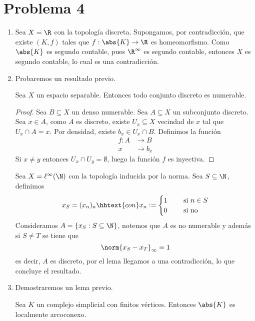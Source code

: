 \documentclass{article}
\begin{document}
\section*{Problema 4}
\begin{enumerate}
    \item Sea $X=\R$ con la topología discreta. Supongamos, por contradicción, que existe $(K,f)$
    tales que $f:\abs{K}\to\R$ es homeomorfismo. Como $\abs{K}$ es segundo contable, pues 
    $\R^{\infty}$ es segundo contable, entonces $X$ es segundo contable, lo cual es una 
    contradicción.

    \item Probaremos un resultado previo.
    \begin{lema}
        Sea $X$ un espacio separable. Entonces todo conjunto discreto es numerable.
    \end{lema}
    \begin{proof}
        Sea $B\subseteq X$ un denso numerable. Sea $A\subseteq X$ un subconjunto discreto. Sea 
        $x\in A$, como $A$ es discreto, existe $U_{x}\subseteq X$ vecindad de $x$ tal que 
        $U_{x}\cap A=x$. Por densidad, existe $b_{x}\in U_{x}\cap B$. Definimos la función
        \begin{align*}
            f:A &\to B \\
            x &\to b_{x}
        \end{align*}
        Si $x\neq y$ entonces $U_{x}\cap U_{y}=\emptyset$, luego la función $f$ es inyectiva.
    \end{proof}

    \noindent Sea $X=\ell^{\infty}(\N)$ con la topología inducida por la norma. Sea 
    $S\subseteq\N$, definimos
    \begin{equation*}
        x_{S}=(x_{n})_{n}\hhtext{con}x_{n}:=\begin{cases}
            1 &\quad\text{ si }n\in S \\
            0 &\quad\text{ si no}
        \end{cases}
    \end{equation*}
    Consideramos $A=\{x_{S}:S\subseteq\N\}$, notemos que $A$ es no numerable y además si $S\neq T$ se tiene que
    \begin{equation*}
        \norm{x_{S}-x_{T}}_{\infty}=1
    \end{equation*}
    es decir, $A$ es discreto, por el lema llegamos a una contradicción, lo que concluye el 
    resultado.

    \item Demostraremos un lema previo.
    \begin{lema}
        Sea $K$ un complejo simplicial con finitos vértices. Entonces $\abs{K}$ es localmente 
        arcoconexo.
    \end{lema}
\end{enumerate}
\end{document}
